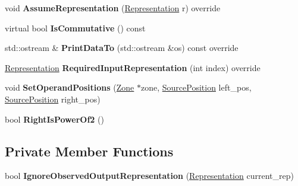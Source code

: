 \begin{DoxyCompactItemize}
\item 
void {\bfseries Assume\+Representation} (\hyperlink{classv8_1_1internal_1_1_representation}{Representation} r) override\hypertarget{classv8_1_1internal_1_1_h_binary_operation_ac849e639768896b0729f70744affa64c}{}\label{classv8_1_1internal_1_1_h_binary_operation_ac849e639768896b0729f70744affa64c}

\item 
virtual bool {\bfseries Is\+Commutative} () const \hypertarget{classv8_1_1internal_1_1_h_binary_operation_a7f40569aadfc98cb47ee646b4b736c4a}{}\label{classv8_1_1internal_1_1_h_binary_operation_a7f40569aadfc98cb47ee646b4b736c4a}

\item 
std\+::ostream \& {\bfseries Print\+Data\+To} (std\+::ostream \&os) const  override\hypertarget{classv8_1_1internal_1_1_h_binary_operation_a6937e37fa2035916ab7daffacf424d92}{}\label{classv8_1_1internal_1_1_h_binary_operation_a6937e37fa2035916ab7daffacf424d92}

\item 
\hyperlink{classv8_1_1internal_1_1_representation}{Representation} {\bfseries Required\+Input\+Representation} (int index) override\hypertarget{classv8_1_1internal_1_1_h_binary_operation_aa465a811eb4dfd304bae8acb158adfae}{}\label{classv8_1_1internal_1_1_h_binary_operation_aa465a811eb4dfd304bae8acb158adfae}

\item 
void {\bfseries Set\+Operand\+Positions} (\hyperlink{classv8_1_1internal_1_1_zone}{Zone} $\ast$zone, \hyperlink{classv8_1_1internal_1_1_source_position}{Source\+Position} left\+\_\+pos, \hyperlink{classv8_1_1internal_1_1_source_position}{Source\+Position} right\+\_\+pos)\hypertarget{classv8_1_1internal_1_1_h_binary_operation_ad6bb8b49a18f3a19c33ed656d591e40e}{}\label{classv8_1_1internal_1_1_h_binary_operation_ad6bb8b49a18f3a19c33ed656d591e40e}

\item 
bool {\bfseries Right\+Is\+Power\+Of2} ()\hypertarget{classv8_1_1internal_1_1_h_binary_operation_ac367945e526aaac0e06b4dcef728a5c2}{}\label{classv8_1_1internal_1_1_h_binary_operation_ac367945e526aaac0e06b4dcef728a5c2}

\end{DoxyCompactItemize}
\subsection*{Private Member Functions}
\begin{DoxyCompactItemize}
\item 
bool {\bfseries Ignore\+Observed\+Output\+Representation} (\hyperlink{classv8_1_1internal_1_1_representation}{Representation} current\+\_\+rep)\hypertarget{classv8_1_1internal_1_1_h_binary_operation_af630e0d6038d3188f189ce977ad33a0d}{}\label{classv8_1_1internal_1_1_h_binary_operation_af630e0d6038d3188f189ce977ad33a0d}

\end{DoxyCompactItemize}
